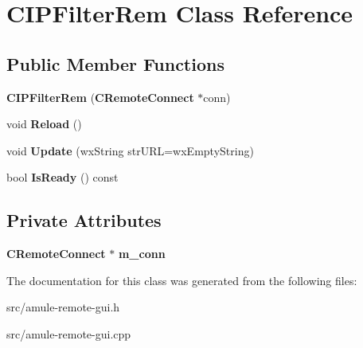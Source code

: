 \section{CIPFilterRem Class Reference}
\label{classCIPFilterRem}
\subsection*{Public Member Functions}
\begin{DoxyCompactItemize}
\item 
{\bfseries CIPFilterRem} ({\bf CRemoteConnect} $\ast$conn)\label{classCIPFilterRem_ac7a406ce275e1179909bb8bd3d941feb}

\item 
void {\bfseries Reload} ()\label{classCIPFilterRem_a211b9974860a4e56653e7aa6c7259305}

\item 
void {\bfseries Update} (wxString strURL=wxEmptyString)\label{classCIPFilterRem_af919d0ba72ed38890bfeab3d215276e2}

\item 
bool {\bfseries IsReady} () const \label{classCIPFilterRem_a0cf3262f0f9e6c594abf01ee6dd27b24}

\end{DoxyCompactItemize}
\subsection*{Private Attributes}
\begin{DoxyCompactItemize}
\item 
{\bf CRemoteConnect} $\ast$ {\bfseries m\_\-conn}\label{classCIPFilterRem_a0fcff83d1b4853c24214df305510518d}

\end{DoxyCompactItemize}


The documentation for this class was generated from the following files:\begin{DoxyCompactItemize}
\item 
src/amule-\/remote-\/gui.h\item 
src/amule-\/remote-\/gui.cpp\end{DoxyCompactItemize}

